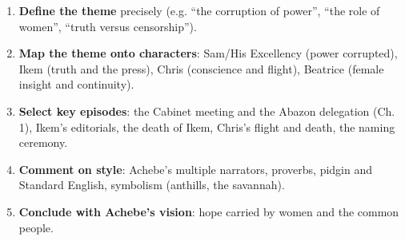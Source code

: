 \documentclass[11pt]{article}
\begin{document}
\begin{methode}
\begin{enumerate}
\item \textbf{Define the theme} precisely (e.g. ``the corruption of power'', ``the role of women'', ``truth versus censorship'').
\item \textbf{Map the theme onto characters}: Sam/His Excellency (power corrupted), Ikem (truth and the press), Chris (conscience and flight), Beatrice (female insight and continuity).
\item \textbf{Select key episodes}: the Cabinet meeting and the Abazon delegation (Ch. 1), Ikem's editorials, the death of Ikem, Chris's flight and death, the naming ceremony.
\item \textbf{Comment on style}: Achebe's multiple narrators, proverbs, pidgin and Standard English, symbolism (anthills, the savannah).
\item \textbf{Conclude with Achebe's vision}: hope carried by women and the common people.
\end{enumerate}
\end{methode}
\end{document}
